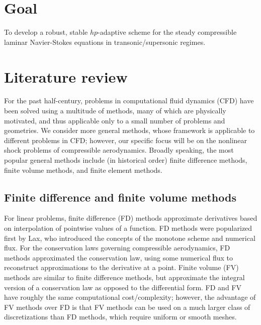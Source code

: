 \documentclass{report}
\begin{document}
\section{Goal}

To develop a robust, stable $hp$-adaptive scheme for the steady compressible laminar Navier-Stokes equations in transonic/supersonic regimes.

\section{Literature review}

For the past half-century, problems in computational fluid dynamics (CFD) have been solved using a multitude of methods, many of which are physically motivated, and thus applicable only to a small number of problems and geometries. We consider more general methods, whose framework is applicable to different problems in CFD; however, our specific focus will be on the nonlinear shock problems of compressible aerodynamics. Broadly speaking, the most popular general methods include (in historical order) finite difference methods, finite volume methods, and finite element methods.  

\subsection{Finite difference and finite volume methods}

For linear problems, finite difference (FD) methods approximate derivatives based on interpolation of pointwise values of a function.  FD methods were popularized first by Lax, who introduced the concepts of the monotone scheme and numerical flux. For the conservation laws governing compressible aerodynamics, FD methods approximated the conservation law, using some numerical flux to reconstruct approximations to the derivative at a point. Finite volume (FV) methods are similar to finite difference methods, but approximate the integral version of a conservation law as opposed to the differential form. FD and FV have roughly the same computational cost/complexity; however, the advantage of FV methods over FD is that FV methods can be used on a much larger class of discretizations than FD methods, which require uniform or smooth meshes. 
\end{document}
